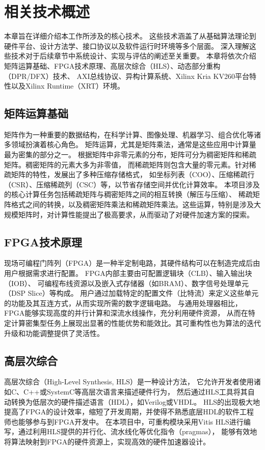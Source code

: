 \chapter{相关技术概述}

本章旨在详细介绍本工作所涉及的核心技术。
这些技术涵盖了从基础算法理论到硬件平台、设计方法学、接口协议以及软件运行时环境等多个层面。
深入理解这些技术对于后续章节中系统设计、实现与评估的阐述至关重要。
本章将依次介绍矩阵运算基础、FPGA技术原理、高层次综合（HLS）、动态部分重构（DPR/DFX）技术、
AXI总线协议、异构计算系统、Xilinx Kria KV260平台特性以及Xilinx Runtime（XRT）环境。

\section{矩阵运算基础}

矩阵作为一种重要的数据结构，在科学计算、图像处理、机器学习、组合优化等诸多领域扮演着核心角色。
矩阵运算，尤其是矩阵乘法，通常是这些应用中计算量最为密集的部分之一。
根据矩阵中非零元素的分布，矩阵可分为稠密矩阵和稀疏矩阵。稠密矩阵的元素大多为非零值，
而稀疏矩阵则包含大量的零元素。针对稀疏矩阵的特性，发展出了多种压缩存储格式，
如坐标列表（COO）、压缩稀疏行（CSR）、压缩稀疏列（CSC）等，以节省存储空间并优化计算效率。
本项目涉及的核心计算任务包括稀疏矩阵与稠密矩阵之间的相互转换（解压与压缩）、
稀疏矩阵格式之间的转换，以及稠密矩阵乘法和稀疏矩阵乘法。这些运算，特别是涉及大规模矩阵时，对计算性能提出了极高要求，从而驱动了对硬件加速方案的探索。

\section{FPGA技术原理}

现场可编程门阵列（FPGA）是一种半定制电路，其硬件结构可以在制造完成后由用户根据需求进行配置。
FPGA内部主要由可配置逻辑块（CLB）、输入输出块（IOB）、
可编程布线资源以及嵌入式存储器（如BRAM）、数字信号处理单元（DSP Slice）等构成。
用户通过加载特定的配置文件（比特流）来定义这些单元的功能及其互连方式，从而实现所需的数字逻辑电路。
与通用处理器相比，FPGA能够实现高度的并行计算和深流水线操作，充分利用硬件资源，
从而在特定计算密集型任务上展现出显著的性能优势和能效比。其可重构性也为算法的迭代升级和功能调整提供了灵活性。

\section{高层次综合}

高层次综合（High-Level Synthesis, HLS）是一种设计方法，
它允许开发者使用诸如C、C++或SystemC等高层次语言来描述硬件行为，
然后通过HLS工具将其自动转换为低层次的硬件描述语言（HDL），如Verilog或VHDL。
HLS的出现极大地提高了FPGA的设计效率，缩短了开发周期，并使得不熟悉底层HDL的软件工程师也能够参与到FPGA开发中。
在本项目中，可重构模块采用Vitis HLS进行编写，通过利用HLS提供的并行化、流水线化等优化指令（pragmas），
能够有效地将算法映射到FPGA的硬件资源上，实现高效的硬件加速器设计。


